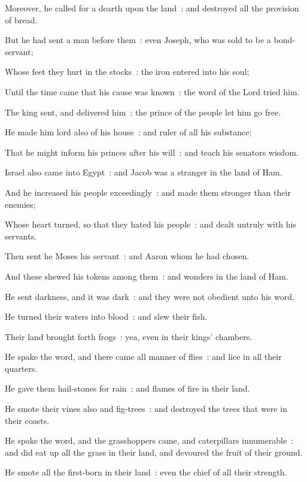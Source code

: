 Moreover, he called for a dearth upon the land~: and destroyed all the provision of bread.\par
{}But he had sent a man before them~: even Joseph, who was sold to be a bond-servant;\par
{}Whose feet they hurt in the stocks~: the iron entered into his soul;\par
{}Until the time came that his cause was known~: the word of the Lord tried him.\par
{}The king sent, and delivered him~: the prince of the people let him go free.\par
{}He made him lord also of his house~: and ruler of all his substance;\par
{}That he might inform his princes after his will~: and teach his senators wisdom.\par
{}Israel also came into Egypt~: and Jacob was a stranger in the land of Ham.\par
{}And he increased his people exceedingly~: and made them stronger than their enemies;\par
{}Whose heart turned, so that they hated his people~: and dealt untruly with his servants.\par
{}Then sent he Moses his servant~: and Aaron whom he had chosen.\par
{}And these shewed his tokens among them~: and wonders in the land of Ham.\par
{}He sent darkness, and it was dark~: and they were not obedient unto his word.\par
{}He turned their waters into blood~: and slew their fish.\par
{}Their land brought forth frogs~: yea, even in their kings' chambers.\par
{}He spake the word, and there came all manner of flies~: and lice in all their quarters.\par
{}He gave them hail-stones for rain~: and flames of fire in their land.\par
{}He smote their vines also and fig-trees~: and destroyed the trees that were in their coasts.\par
{}He spake the word, and the grasshoppers came, and caterpillars innumerable~: and did eat up all the grass in their land, and devoured the fruit of their ground.\par
{}He smote all the first-born in their land~: even the chief of all their strength.\par
